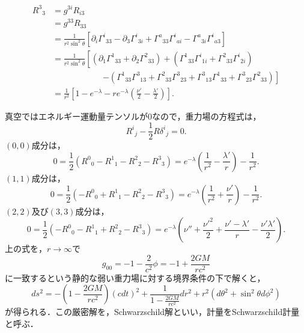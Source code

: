 \documentclass[a4paper]{ltjsreport}
\begin{document}
\begin{align*}
  {R^3}_3 &= g^{3i}R_{i3}\\
  &= g^{33}R_{33}\\
  &= \frac{1}{r^2\sin^2\theta}\left[\partial_i{\Gamma^i}_{33} - \partial_3{\Gamma^i}_{3i} + {\Gamma^a}_{33}{\Gamma^i}_{ai} - {\Gamma^a}_{3i}{\Gamma^i}_{a3}\right]\\
  &= \frac{1}{r^2\sin^2\theta}\left[\left(\partial_1{\Gamma^1}_{33} + \partial_2{\Gamma^2}_{33}\right) + \left({\Gamma^1}_{33}{\Gamma^i}_{1i} + {\Gamma^2}_{33}{\Gamma^i}_{2i}\right) \right.\\
  & \qquad \qquad \qquad \left. - \left({\Gamma^1}_{33}{\Gamma^3}_{13} + {\Gamma^2}_{33}{\Gamma^3}_{23} + {\Gamma^3}_{13}{\Gamma^1}_{33} + {\Gamma^3}_{23}{\Gamma^2}_{33}\right)\right]\\
  &= \frac{1}{r^2}\left[1 - e^{ - \lambda} - re^{ - \lambda}\left(\frac{\nu'}{2} - \frac{\lambda'}{2}\right)\right] .
\end{align*}

真空ではエネルギー運動量テンソルが0なので，重力場の方程式は，
\[ {R^i}_j - \frac{1}{2}R{\delta^i}_j=0 . \]
$(0, 0)$成分は，
\[0=\frac{1}{2}\left({R^0}_0 - {R^1}_1 - {R^2}_2 - {R^3}_3\right)=e^{ - \lambda}\left(\frac{1}{r^2} - \frac{\lambda'}{r}\right) - \frac{1}{r^2} . \]
$(1, 1)$成分は，
\[0=\frac{1}{2}\left( - {R^0}_0 + {R^1}_1 - {R^2}_2 - {R^3}_3\right)=e^{ - \lambda}\left(\frac{1}{r^2} + \frac{\nu'}{r}\right) - \frac{1}{r^2}.\]
$(2, 2)$及び$(3, 3)$成分は，
\[0=\frac{1}{2}\left( - {R^0}_0 - {R^1}_1 + {R^2}_2 - {R^3}_3\right)=e^{ - \lambda}\left(\nu'' + \frac{\nu'^2}{2} + \frac{\nu' - \lambda'}{r} - \frac{\nu'\lambda'}{2}\right).\]
上の式を，$r\to\infty$で
\[g_{00}= - 1 - \frac{2}{c^2}\phi= - 1 + \frac{2GM}{rc^2}\]
に一致するという静的な弱い重力場に対する境界条件の下で解くと，
\[ds^2= - \left(1 - \frac{2GM}{rc^2}\right)(cdt)^2 + \frac{1}{1 - \frac{2GM}{rc^2}}dr^2 + r^2(d\theta^2 + \sin^2\theta{}d\phi^2)\]
が得られる．この厳密解を，Schwarzschild解といい，計量をSchwarzschild計量と呼ぶ．
\end{document}
